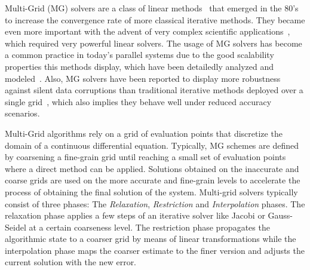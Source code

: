 Multi-Grid (MG) solvers are a class of linear methods~\cite{Hackbusch1991} that
emerged in the 80's to increase the convergence rate of more classical
iterative methods.  They became even more important with the advent of very
complex scientific applications~\cite{Ashby1996}, which required very powerful
linear solvers.  The usage of MG solvers has become a common practice in
today's parallel systems due to the good scalability properties this methods
display, which have been detailedly analyzed and modeled~\cite{Gahvari11}.
Also, MG solvers have been reported to display more robustness against silent
data corruptions than traditional iterative methods deployed over a single
grid~\cite{Casas12}, which also implies they behave well under reduced accuracy
scenarios.

Multi-Grid
algorithms rely on a grid of evaluation points that discretize the
domain of a continuous differential equation.  Typically, MG schemes are
defined by coarsening a fine-grain grid until reaching a small set of
evaluation points where a direct method can be applied.
Solutions obtained on the inaccurate and coarse grids are used on the more
accurate and fine-grain levels to accelerate the process of obtaining the final
solution of the system.
Multi-grid solvers typically consist of three phases: The \textit{Relaxation},
\textit{Restriction} and \textit{Interpolation} phases.  The relaxation phase
applies a few steps of an iterative solver like Jacobi or Gauss-Seidel at a
certain coarseness level.  The restriction phase propagates the algorithmic
state to a coarser grid by means of linear transformations while the
interpolation phase maps the coarser estimate to the finer version and adjusts
the current solution with the new error.

